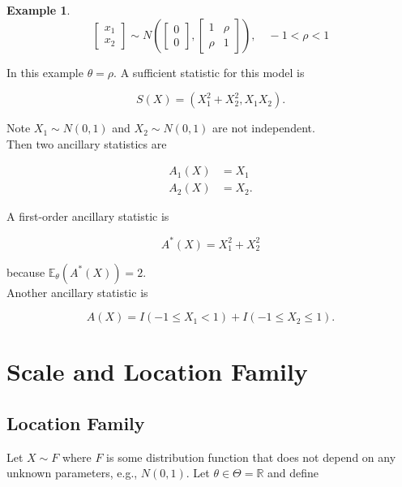 \documentclass[12pt]{article}
\theoremstyle{definition}
\newtheorem*{example}{Example}
\begin{document}
\begin{example}

\begin{equation*}
\begin{bmatrix}
x_1 \\
x_2
\end{bmatrix}
\sim
N \left(
\begin{bmatrix}
0 \\
0
\end{bmatrix},
\begin{bmatrix}
1 & \rho \\
\rho & 1
\end{bmatrix}
\right),
\quad
-1 < \rho < 1
\end{equation*}

In this example $\theta = \rho$. A sufficient statistic for this model is

$$ S(X) = (X_1^2 + X_2^2, X_1 X_2). $$

Note $X_1 \sim N(0, 1)$ and $X_2 \sim N(0, 1)$ are not independent. \\

Then two ancillary statistics are

\begin{align*}
A_1(X) &= X_1 \\
A_2(X) &= X_2.
\end{align*}

A first-order ancillary statistic is

$$ A^* (X) = X_1^2 + X_2^2 $$

because $\mathbb{E}_{\theta} (A^* (X) ) = 2$.\\

Another ancillary statistic is 

$$ A(X) = I(-1 \leq X_1 < 1) + I(-1 \leq X_2 \leq 1). $$

\end{example}

\section{Scale and Location Family}


\subsection{Location Family}

Let $X \sim F$ where $F$ is some distribution function that does not depend
on any unknown parameters, e.g., $N(0,1)$. Let $\theta \in \Theta = \mathbb{R}$ and
define
\end{document}
